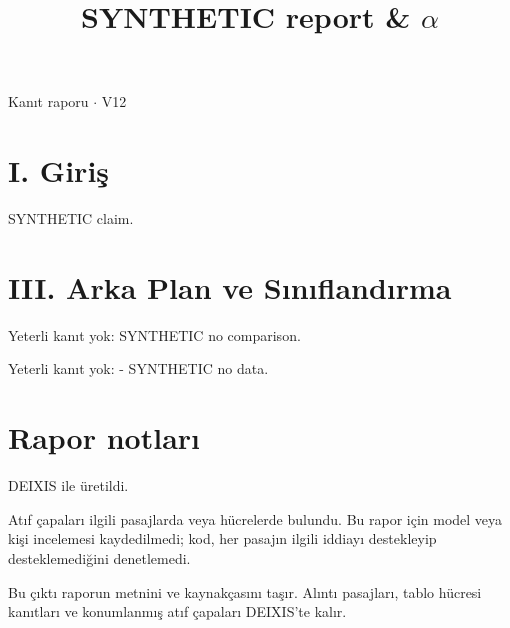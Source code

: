 \documentclass[journal]{IEEEtran}
\begin{document}
\renewcommand{\abstractname}{Özet}
\renewcommand{\IEEEkeywordsname}{Dizin Terimleri}
\renewcommand{\refname}{Kaynaklar}

\title{SYNTHETIC report \& \ensuremath{\alpha}}

\maketitle

\noindent Kanıt raporu \ensuremath{\cdot} V12

\section*{I. Giriş}

SYNTHETIC claim. \cite{Synth26}

\section*{III. Arka Plan ve Sınıflandırma}

Yeterli kanıt yok: SYNTHETIC no comparison.

Yeterli kanıt yok: - SYNTHETIC no data.

\section*{Rapor notları}

DEIXIS ile üretildi.

Atıf çapaları ilgili pasajlarda veya hücrelerde bulundu. Bu rapor için model veya kişi incelemesi kaydedilmedi; kod, her pasajın ilgili iddiayı destekleyip desteklemediğini denetlemedi.

Bu çıktı raporun metnini ve kaynakçasını taşır. Alıntı pasajları, tablo hücresi kanıtları ve konumlanmış atıf çapaları DEIXIS'te kalır.




\end{document}
